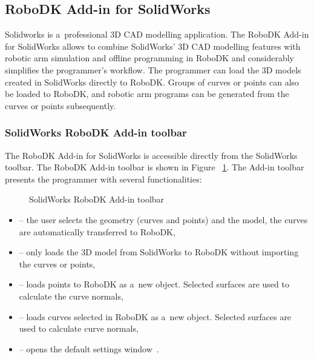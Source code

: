 \subsection{RoboDK Add-in for SolidWorks}

Solidworks is a~professional 3D CAD modelling application. The RoboDK Add-in for SolidWorks allows to combine SolidWorks' 3D CAD modelling features with robotic arm simulation and offline programming in RoboDK and considerably simplifies the programmer's workflow. The programmer can load the 3D models created in SolidWorks directly to RoboDK. Groups of curves or points can also be loaded to RoboDK, and robotic arm programs can be generated from the curves or points subsequently.

\subsubsection*{SolidWorks RoboDK Add-in toolbar}

The RoboDK Add-in for SolidWorks is accessible directly from the SolidWorks toolbar.  The RoboDK Add-in toolbar is shown in Figure~ \ref{fig:solidworkstoolbar}. The Add-in toolbar presents the programmer with several functionalities:

\begin{figure}[h!]
    \centering
    \noindent{}
    \caption{SolidWorks RoboDK Add-in toolbar}
    \label{fig:solidworkstoolbar}
\end{figure}

\begin{itemize}
    \item {} -- the user selects the geometry (curves and points) and the model, the curves are automatically transferred to RoboDK,
    \item {} -- only loads the 3D model from SolidWorks to RoboDK without importing the curves or points,
    \item {} -- loads points to RoboDK as a~new object. Selected surfaces are used to calculate the curve normals, 
    \item {} --  loads curves selected in RoboDK as a~new object. Selected surfaces are used to calculate curve normals, 
    \item {} -- opens the default settings window~\cite{robodksolidworks}.
\end{itemize}




